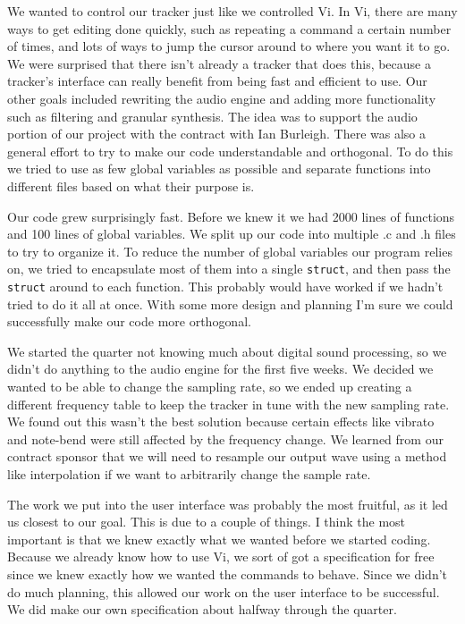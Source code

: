 \documentclass[12pt,letterpaper]{article}
\begin{document}
\par
We wanted to control our tracker just like we controlled Vi.
In Vi, there are many ways to get editing done quickly, such as repeating a command a certain number of times, and lots of ways to jump the cursor around to where you want it to go.
We were surprised that there isn't already a tracker that does this, because a tracker's interface can really benefit from being fast and efficient to use.
Our other goals included rewriting the audio engine and adding more functionality such as filtering and granular synthesis.
The idea was to support the audio portion of our project with the contract with Ian Burleigh.
There was also a general effort to try to make our code understandable and orthogonal.
To do this we tried to use as few global variables as possible and separate functions into different files based on what their purpose is.

\par
Our code grew surprisingly fast.
Before we knew it we had 2000 lines of functions and 100 lines of global variables.
We split up our code into multiple .c and .h files to try to organize it.
To reduce the number of global variables our program relies on, we tried to encapsulate most of them into a single {\tt struct}, and then pass the {\tt struct} around to each function.
This probably would have worked if we hadn't tried to do it all at once.
With some more design and planning I'm sure we could successfully make our code more orthogonal.

\par
We started the quarter not knowing much about digital sound processing, so we didn't do anything to the audio engine for the first five weeks.
We decided we wanted to be able to change the sampling rate, so we ended up creating a different frequency table to keep the tracker in tune with the new sampling rate.
We found out this wasn't the best solution because certain effects like vibrato and note-bend were still affected by the frequency change.
We learned from our contract sponsor that we will need to resample our output wave using a method like interpolation if we want to arbitrarily change the sample rate.


\par
The work we put into the user interface was probably the most fruitful, as it led us closest to our goal.
This is due to a couple of things.
I think the most important is that we knew exactly what we wanted before we started coding.
Because we already know how to use Vi, we sort of got a specification for free since we knew exactly how we wanted the commands to behave.
Since we didn't do much planning, this allowed our work on the user interface to be successful.
We did make our own specification about halfway through the quarter.
\end{document}
